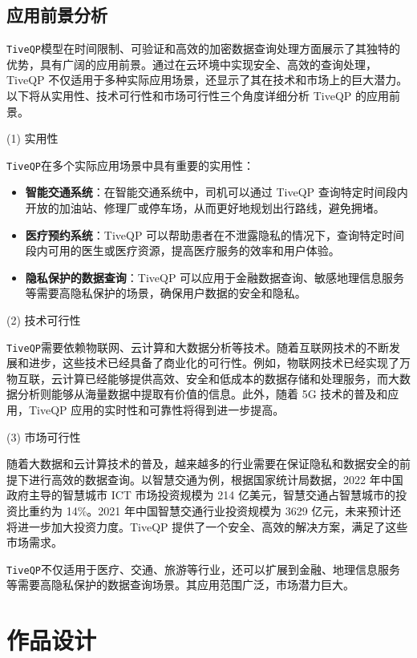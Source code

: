 \documentclass{cumcmthesis}
\numberwithin{equation}{section} %
\numberwithin{figure}{section} %
\numberwithin{table}{section} %
\begin{document}
\subsection{应用前景分析}

\texttt{TiveQP}模型在时间限制、可验证和高效的加密数据查询处理方面展示了其独特的优势，具有广阔的应用前景。通过在云环境中实现安全、高效的查询处理，TiveQP 不仅适用于多种实际应用场景，还显示了其在技术和市场上的巨大潜力。以下将从实用性、技术可行性和市场可行性三个角度详细分析 TiveQP 的应用前景。

(1) 实用性

\texttt{TiveQP}在多个实际应用场景中具有重要的实用性：
\begin{itemize}
    \item \textbf{智能交通系统}：在智能交通系统中，司机可以通过 TiveQP 查询特定时间段内开放的加油站、修理厂或停车场，从而更好地规划出行路线，避免拥堵。
    \item \textbf{医疗预约系统}：TiveQP 可以帮助患者在不泄露隐私的情况下，查询特定时间段内可用的医生或医疗资源，提高医疗服务的效率和用户体验。
    \item \textbf{隐私保护的数据查询}：TiveQP 可以应用于金融数据查询、敏感地理信息服务等需要高隐私保护的场景，确保用户数据的安全和隐私。
\end{itemize}

(2) 技术可行性

\texttt{TiveQP}需要依赖物联网、云计算和大数据分析等技术。随着互联网技术的不断发展和进步，这些技术已经具备了商业化的可行性。例如，物联网技术已经实现了万物互联，云计算已经能够提供高效、安全和低成本的数据存储和处理服务，而大数据分析则能够从海量数据中提取有价值的信息。此外，随着 5G 技术的普及和应用，TiveQP 应用的实时性和可靠性将得到进一步提高。

(3) 市场可行性

随着大数据和云计算技术的普及，越来越多的行业需要在保证隐私和数据安全的前提下进行高效的数据查询。以智慧交通为例，根据国家统计局数据，2022 年中国政府主导的智慧城市 ICT 市场投资规模为 214 亿美元，智慧交通占智慧城市的投资比重约为 14\%。2021 年中国智慧交通行业投资规模为 3629 亿元，未来预计还将进一步加大投资力度。TiveQP 提供了一个安全、高效的解决方案，满足了这些市场需求。

\texttt{TiveQP}不仅适用于医疗、交通、旅游等行业，还可以扩展到金融、地理信息服务等需要高隐私保护的数据查询场景。其应用范围广泛，市场潜力巨大。

\newpage

\section{作品设计}
\end{document}
